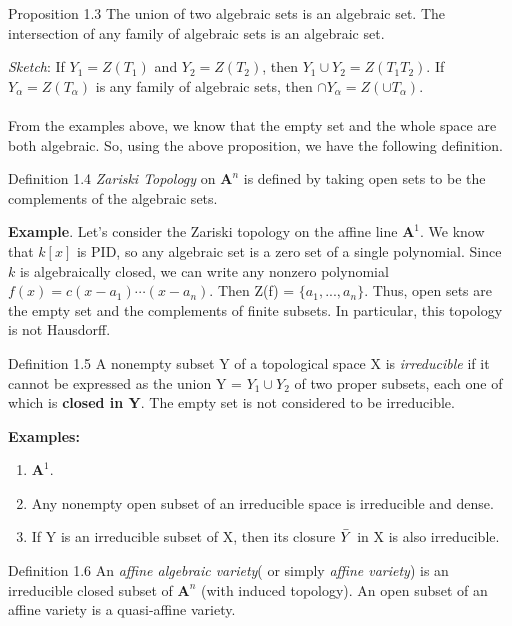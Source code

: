 \documentclass[12pt]{article}
\begin{document}
\begin{propositionBox}{Proposition 1.3}
    The union of two algebraic sets is an algebraic set. The intersection of any family of algebraic sets is an algebraic set. 
\end{propositionBox}
\textit{Sketch}: If $Y_{1} = Z(T_{1})$ and $Y_{2} = Z(T_{2})$, then $Y_{1} \cup Y_{2} = Z(T_{1}T_{2}).$ If $Y_{\alpha} = Z(T_{\alpha})$ is any family of algebraic sets, then $\cap Y_{\alpha} = Z(\cup T_{\alpha}).$\\\\  From the examples above, we know that the empty set and the whole space are both algebraic. So, using the above proposition, we have the following definition.
\begin{definitionBox}{Definition 1.4}
    \textit{Zariski Topology} on $\mathbf{A}^n$ is defined by taking open sets to be the complements of the algebraic sets.
\end{definitionBox}\noindent
\textbf{Example}. Let's consider the Zariski topology on the affine line $\mathbf{A}^1$. We know that $k[x]$ is PID, so any algebraic set is a zero set of a single polynomial. Since $k$ is algebraically closed, we can write any nonzero polynomial $f(x) = c(x - a_{1})\cdots (x - a_{n})$. Then Z(f) = $\{a_{1},...,a_{n}\}$. Thus, open sets are the empty set and the complements of finite subsets. In particular, this topology is not Hausdorff.
\begin{definitionBox}{Definition 1.5}
A nonempty subset Y of a topological space X is \textit{irreducible} if it cannot be expressed as the union Y = $Y_{1} \cup Y_{2}$ of two proper subsets, each one of which is \textbf{closed in Y}. The empty set is not considered to be irreducible.
\end{definitionBox}\noindent
\textbf{Examples:} \begin{enumerate}
    \item $\mathbf{A}^1$.
    \item Any nonempty open subset of an irreducible space is irreducible and dense.
    \item If Y is an irreducible subset of X, then its closure $\Bar{Y}$ in X is also irreducible.
\end{enumerate} 
\begin{definitionBox}{Definition 1.6}
An \textit{affine algebraic variety}( or simply \textit{affine variety})
is an irreducible closed subset of $\mathbf{A}^n$ (with induced topology). An open subset of an affine variety is a quasi-affine variety.
\end{definitionBox}\noindent
\end{document}
